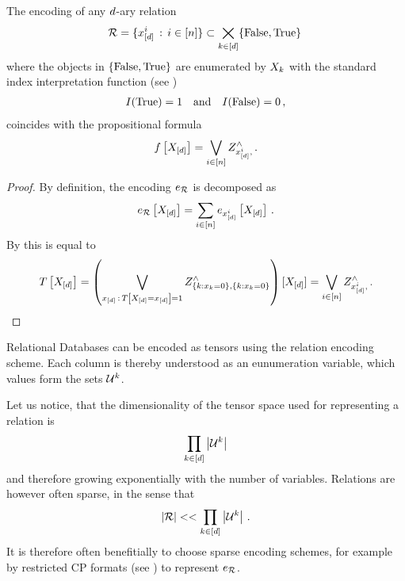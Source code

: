 
\begin{theorem}
	The encoding of any $d$-ary relation
	\begin{align*}
		\mathcal{R} = \{ x_{[d]}^{i} \, : \, i\in[n] \} \subset \bigtimes_{k\in[d]} \{\mathrm{False},\mathrm{True}\} \,
	\end{align*}
	where the objects in $\{\mathrm{False},\mathrm{True}\}$ are enumerated by $X_{k}$ with the standard index interpretation function (see )
	\begin{align*}
		I(\mathrm{True}) = 1 \quad \text{and} \quad I(\mathrm{False}) = 0 \, ,
	\end{align*}
	coincides with the propositional formula
	\begin{align*}
		f\left[X_{[d]}\right] = \bigvee_{i\in[n]} Z^{\land}_{x_{[d]}^{i},\,} .
	\end{align*}
\end{theorem}
\begin{proof}
	By definition, the encoding $e_{\mathcal{R}}$ is decomposed as
	\begin{align*}
		e_{\mathcal{R}}\left[X_{[d]}\right]
		= \sum_{i\in[n]} e_{x_{[d]}^{i}}\left[X_{[d]}\right] \, .
	\end{align*}
	By  this is equal to
	\begin{align*}
		T\left[X_{[d]}\right] = \left( \bigvee_{x_{[d]} \, : \, T\left[X_{[d]}=x_{[d]}\right] = 1}
		Z^{\land}_{\{k : x_{k}=0\},\{k : x_{k}=0\}}
		\right)[X_{[d]}]
		= \bigvee_{i\in[n]} Z^{\land}_{x_{[d]}^{i},\,} .
	\end{align*}
\end{proof}


\begin{example}
	Relational Databases can be encoded as tensors using the relation encoding scheme.
	Each column is thereby understood as an eunumeration variable, which values form the sets $\mathcal{U}^{k}$.
\end{example}

Let us notice, that the dimensionality of the tensor space used for representing a relation is
\begin{align*}
	\prod_{k\in[d]} \left|\mathcal{U}^{k}\right|
\end{align*}
and therefore growing exponentially with the number of variables.
Relations are however often sparse, in the sense that
\begin{align*}
	 \left|\mathcal{R}\right| << \prod_{k\in[d]} \left|\mathcal{U}^{k}\right| \, .
\end{align*}
It is therefore often benefitially to choose sparse encoding schemes, for example by restricted CP formats (see ) to represent $e_{\mathcal{R}}$.


